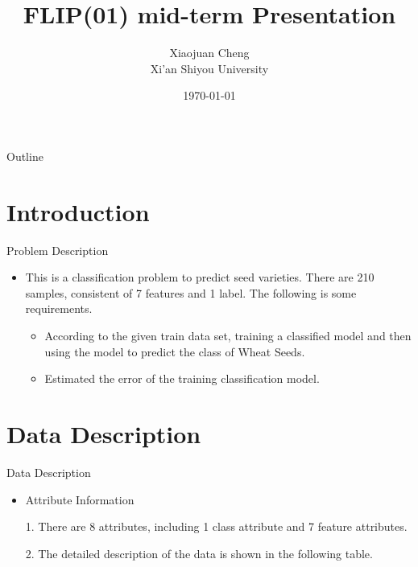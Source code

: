 \documentclass[
 size=12pt,
 paper=smartboard, %
 mode=present, %
 display=slides, %
 style=tuliplab,  %
 pauseslide,
 fleqn,leqno,clock]{powerdot}
\title{FLIP(01) mid-term Presentation}
\author{Xiaojuan Cheng\\
Xi'an Shiyou University
}
\date{\today}
\begin{document}
\maketitle

\begin{slide}[toc=,bm=]{Outline}
  \tableofcontents[content=sections]
\end{slide}

\section{Introduction}

\begin{slide}{Problem Description}
\begin{itemize}
\item<1->
This is a classification problem to predict seed varieties.
There are 210 samples, consistent of 7 features and 1 label.
The following is some requirements.
 \begin{itemize}
 \item<2->
    According to the given train data set,
    training a classified model and then using the model to predict the class of Wheat Seeds.
 \item<2->
    Estimated the error of the training classification model.\pause
\end{itemize}
\end{itemize}
\end{slide}

\section{Data Description}
%
\begin{slide}{Data Description}
\begin{itemize}
\item<1-> 
Attribute Information 
\item[1.]
There are 8 attributes, including 1 class attribute and 7 feature attributes. 
\item[2.]
The detailed description of the data is shown in the following table. 
\end{itemize}
\end{slide}
\end{document}
